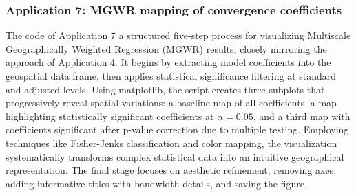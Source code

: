 \documentclass[smallextended, natbib]{svjour3}       %
\begin{document}
\subsubsection*{Application 7: MGWR mapping of convergence coefficients}

The code of Application 7 a structured five-step process for visualizing Multiscale Geographically Weighted Regression (MGWR) results, closely mirroring the approach of Application 4. 
It begins by extracting model coefficients into the geospatial data frame, then applies statistical significance filtering at standard and adjusted levels. 
Using matplotlib, the script creates three subplots that progressively reveal spatial variations: a baseline map of all coefficients, a map highlighting statistically significant coefficients at $\alpha = 0.05$, and a third map with coefficients significant after p-value correction due to multiple testing.
Employing techniques like Fisher-Jenks classification and color mapping, the visualization systematically transforms complex statistical data into an intuitive geographical representation. 
The final stage focuses on aesthetic refinement, removing axes, adding informative titles with bandwidth details, and saving the figure.
\end{document}
